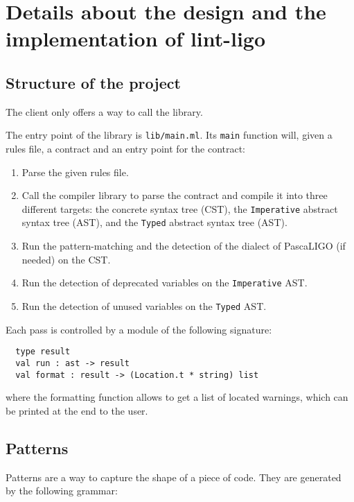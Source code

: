 \documentclass[10pt,a4paper]{article}
\begin{document}

\section{Details about the design and the implementation of lint-ligo}

\subsection{Structure of the project}

The client only offers a way to call the library.

The entry point of the library is \verb|lib/main.ml|. Its \verb|main|
function will, given a rules file, a contract and an entry point for
the contract:

\begin{enumerate}
\item
  Parse the given rules file.

\item
  Call the compiler library to parse the contract and compile it into
  three different targets:
  the concrete syntax tree (CST),
  the \verb|Imperative| abstract syntax tree (AST),
  and the \verb|Typed| abstract syntax tree (AST).

\item
  Run the pattern-matching and the detection of the dialect of
  PascaLIGO (if needed) on the CST.

\item
  Run the detection of deprecated variables on the
  \verb|Imperative| AST.

\item
  Run the detection of unused variables on the \verb|Typed| AST.
\end{enumerate}

Each pass is controlled by a module of the following signature:
\begin{verbatim}
  type result
  val run : ast -> result
  val format : result -> (Location.t * string) list
\end{verbatim}

where the formatting function allows to get a list of located
warnings, which can be printed at the end to the user.

\subsection{Patterns}
Patterns are a way to capture the shape of a piece of code. They are
generated by the following grammar:
\end{document}
